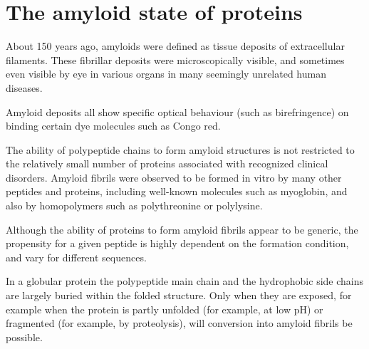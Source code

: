 

\section{The amyloid state of proteins}

About 150 years ago, amyloids were defined as tissue deposits of extracellular filaments.\cite{Haass:2007db,Sipe:2000fs} These fibrillar deposits were microscopically visible, and sometimes even visible by eye in various organs in many seemingly unrelated human diseases.

Amyloid deposits all show specific optical behaviour (such as birefringence) on binding certain dye molecules such as Congo red.

The ability of polypeptide chains to form amyloid structures is not restricted to the relatively small number of proteins associated with recognized clinical disorders. Amyloid fibrils were observed to be formed in vitro by many other peptides and proteins, including well-known molecules such as myoglobin, and also by homopolymers such as polythreonine or polylysine.  

Although the ability of proteins to form amyloid fibrils appear to be generic, the propensity for a given peptide is highly dependent on the formation condition, and vary for different sequences. 


In a globular protein the polypeptide main chain and the hydrophobic side chains are largely buried within the folded structure. Only when they are exposed, for example when the protein is partly unfolded (for example, at low pH) or fragmented (for example, by proteolysis), will conversion into amyloid fibrils be possible. 


